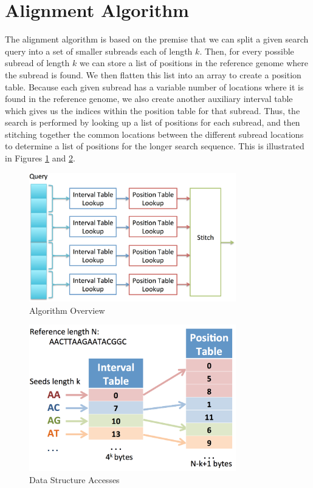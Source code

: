 \documentclass[11pt]{article}
\begin{document}
\section{Alignment Algorithm}

The alignment algorithm is based on the premise that we can split a given search query into a set of smaller subreads each of length $k$. Then, for every possible subread of length $k$ we can store a list of positions in the reference genome where the subread is found. We then flatten this list into an array to create a position table. Because each given subread has a variable number of locations where it is found in the reference genome, we also create another auxiliary interval table which gives us the indices within the position table for that subread. Thus, the search is performed by looking up a list of positions for each subread, and then stitching together the common locations between the different subread locations to determine a list of positions for the longer search sequence.  This is illustrated in Figures \ref{archprocess} and \ref{algorithm}.
\begin{figure}[ht!]
\centering
\includegraphics[width=90mm]{archprocess.png}
\caption{Algorithm Overview}
\label{archprocess}
\end{figure}

\begin{figure}[ht!]
\centering
\includegraphics[width=90mm]{algorithm.png}
\caption{Data Structure Accesses}
\label{algorithm}
\end{figure}
\end{document}
